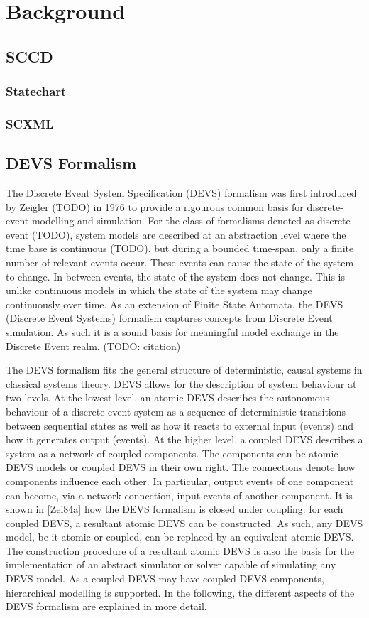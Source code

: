 \chapter{Background}
\label{chapt:Background}

\section{SCCD}
\subsection{Statechart}
\subsection{SCXML}

\section{DEVS Formalism}
The Discrete Event System Specification (DEVS)
formalism was first introduced by Zeigler (TODO) in 1976 to provide a rigourous common basis for discrete-event modelling and 
simulation. For the class of formalisms denoted as discrete-event (TODO), system models are described at an abstraction 
level where the time base is continuous (TODO), but during a bounded time-span, only a finite number of relevant events 
occur. These events can cause the state of the system to change. In between events, the state of the system does not 
change. This is unlike continuous models in which the state of the system may change continuously over time. As an 
extension of Finite State Automata, the DEVS (Discrete Event Systems) formalism captures concepts from Discrete Event 
simulation. As such it is a sound basis for meaningful model exchange in the Discrete Event realm. (TODO: citation)

The DEVS formalism fits the general structure of deterministic, causal systems in classical systems theory. DEVS allows 
for the description of system behaviour at two levels. At the lowest level, an atomic DEVS describes the autonomous 
behaviour of a discrete-event system as a sequence of deterministic transitions between sequential states as well as 
how it reacts to external input (events) and how it generates output (events). At the higher level, a coupled DEVS 
describes a system as a network of coupled components. The components can be atomic DEVS models or coupled DEVS in their 
own right. The connections denote how components influence each other. In particular, output events of one component 
can become, via a network connection, input events of another component. It is shown in [Zei84a] how the DEVS formalism 
is closed under coupling: for each coupled DEVS, a resultant atomic DEVS can be constructed. As such, any DEVS model, 
be it atomic or coupled, can be replaced by an equivalent atomic DEVS. The construction procedure of a resultant atomic 
DEVS is also the basis for the implementation of an abstract simulator or solver capable of simulating any DEVS model. 
As a coupled DEVS may have coupled DEVS components, hierarchical modelling is supported. In the following, the different 
aspects of the DEVS formalism are explained in more detail.

